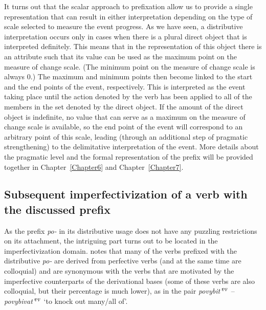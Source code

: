 It turns out that the scalar approach to prefixation  allow us to provide a single representation that can result in either interpretation depending on the type of scale selected to measure the event progress. As we have seen, a distributive  interpretation occurs only in cases when there is a plural direct object that is interpreted definitely. This means that in the representation of this object there is an attribute such that its value can be used as the maximum point on the measure of change scale. (The minimum point on the measure of change scale is always 0.) The maximum and minimum points then become linked to the start and the end points of the event, respectively. This is interpreted as the event taking place until the action denoted by the verb has been applied to all of the members in the set denoted by the direct object. If the amount of the direct object is indefinite, no value that can serve as a maximum on the measure of change scale is available, so the end point of the event will correspond to an arbitrary point of this scale, leading (through an additional step of pragmatic strengthening) to the delimitative  interpretation of the event. More details about the pragmatic level and the formal representation of the prefix will be provided together in Chapter~\ref{Chapter6} and Chapter~\ref{Chapter7}.

\subsection{Subsequent imperfectivization  of a verb with the discussed prefix}
As the prefix \textit{po-}   in its distributive  usage does not have any puzzling restrictions on its attachment, the intriguing part turns out to be located in the imperfectivization  domain. \citet[365]{Shvedova:82} notes that many of the verbs prefixed with the distributive  \textit{po-}   are derived from perfective verbs  (and at the same time are colloquial) and are synonymous with the verbs that are motivated by the imperfective counterparts of the derivational bases (some of these verbs are also colloquial, but their percentage is much lower), as in the pair \textit{povybit'}$^{\textsc{pf}}$ -- \textit{povybivat'}$^{\textsc{pf}}$ `to knock out many/all of'.

